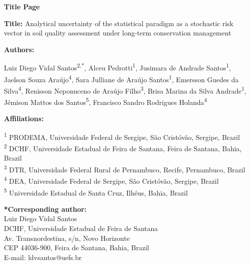 \documentclass[12pt,a4paper]{article}
\begin{document}
\begin{center}
{\Large\bfseries Title Page}
\end{center}

\bigskip

\noindent\textbf{Title:} Analytical uncertainty of the statistical paradigm as a stochastic risk vector in soil quality assessment under long-term conservation management

\bigskip

\noindent\textbf{Authors:}

\medskip

\noindent
Luiz Diego Vidal Santos\textsuperscript{2,*},
Alceu Pedrotti\textsuperscript{1},
Jusimara de Andrade Santos\textsuperscript{1},
Jaelson Souza Ara\'{u}jo\textsuperscript{4},
Sara Julliane de Ara\'{u}jo Santos\textsuperscript{1},
Emersson Guedes da Silva\textsuperscript{4},
Renisson Neponuceno de Ara\'{u}jo Filho\textsuperscript{3},
Brisa Marina da Silva Andrade\textsuperscript{1},
J\'{e}mison Mattos dos Santos\textsuperscript{5},
Francisco Sandro Rodrigues Holanda\textsuperscript{4}

\bigskip

\noindent\textbf{Affiliations:}

\medskip

\noindent
\textsuperscript{1} PRODEMA, Universidade Federal de Sergipe, S\~{a}o Crist\'{o}v\~{a}o, Sergipe, Brazil\\[3pt]
\textsuperscript{2} DCHF, Universidade Estadual de Feira de Santana, Feira de Santana, Bahia, Brazil\\[3pt]
\textsuperscript{3} DTR, Universidade Federal Rural de Pernambuco, Recife, Pernambuco, Brazil\\[3pt]
\textsuperscript{4} DEA, Universidade Federal de Sergipe, S\~{a}o Crist\'{o}v\~{a}o, Sergipe, Brazil\\[3pt]
\textsuperscript{5} Universidade Estadual de Santa Cruz, Ilh\'{e}us, Bahia, Brazil

\bigskip

\noindent\textbf{*Corresponding author:}\\
Luiz Diego Vidal Santos\\
DCHF, Universidade Estadual de Feira de Santana\\
Av. Transnordestina, s/n, Novo Horizonte\\
CEP 44036-900, Feira de Santana, Bahia, Brazil\\
E-mail: ldvsantos@uefs.br

\bigskip
\end{document}
